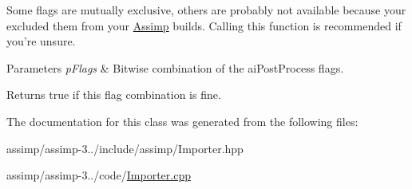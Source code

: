 Some flags are mutually exclusive, others are probably not available because your excluded them from your \hyperlink{class_assimp}{Assimp} builds. Calling this function is recommended if you're unsure.


\begin{DoxyParams}{Parameters}
{\em p\+Flags} & Bitwise combination of the ai\+Post\+Process flags. \\
\hline
\end{DoxyParams}
\begin{DoxyReturn}{Returns}
true if this flag combination is fine. 
\end{DoxyReturn}


The documentation for this class was generated from the following files\+:\begin{DoxyCompactItemize}
\item 
assimp/assimp-\/3../include/assimp/Importer.\+hpp\item 
assimp/assimp-\/3../code/\hyperlink{_importer_8cpp}{Importer.\+cpp}\end{DoxyCompactItemize}
